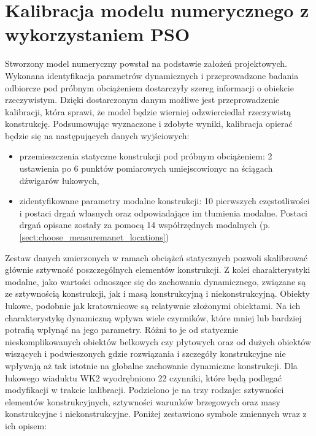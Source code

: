 \section{Kalibracja modelu numerycznego z wykorzystaniem PSO} \label{sect:wk2_calibration}
Stworzony model numeryczny powstał na podstawie założeń projektowych. Wykonana identyfikacja parametrów dynamicznych i przeprowadzone badania odbiorcze pod próbnym obciążeniem dostarczyły szereg informacji o obiekcie rzeczywistym. Dzięki dostarczonym danym możliwe jest przeprowadzenie kalibracji, która sprawi, że model będzie wierniej odzwierciedlał rzeczywistą konstrukcję. Podsumowując wyznaczone i zdobyte wyniki, kalibracja opierać będzie się na następujących danych wyjściowych:
\begin{itemize}
	\item przemieszczenia statyczne konstrukcji pod próbnym obciążeniem: 2 ustawienia po 6 punktów pomiarowych umiejscowionyc na ściągach dźwigarów łukowych,
	\item zidentyfikowane parametry modalne konstrukcji: 10 pierwszych częstotliwości i postaci drgań własnych oraz odpowiadające im tłumienia modalne. Postaci drgań opisane zostały za pomocą 14 współrzędnych modalnych (p. \ref{sect:choose_measuremanet_locations})
\end{itemize}
Zestaw danych zmierzonych w ramach obciążeń statycznych pozwoli skalibrować głównie sztywność poszczególnych elementów konstrukcji. Z kolei charakterystyki modalne, jako wartości odnoszące się do zachowania dynamicznego, związane są ze sztywnością konstrukcji, jak i masą konstrukcyjną i niekonstrukcyjną.
Obiekty łukowe, podobnie jak kratownicowe są relatywnie złożonymi obiektami. Na ich charakterystykę dynamiczną wpływa wiele czynników, które mniej lub bardziej potrafią wpłynąć na jego parametry. Różni to je od statycznie nieskomplikowanych obiektów belkowych czy płytowych oraz od dużych obiektów wiszących i podwieszonych gdzie rozwiązania i szczegóły konstrukcyjne nie wpływają aż tak istotnie na globalne zachowanie dynamiczne konstrukcji. Dla łukowego wiaduktu WK2 wyodrębniono 22 czynniki, które będą podlegać modyfikacji w trakcie kalibracji. Podzielono je na trzy rodzaje: sztywności elementów konstrukcyjnych, sztywności warunków brzegowych oraz masy konstrukcyjne i niekonstrukcyjne. Poniżej zestawiono symbole zmiennych wraz z ich opisem:

